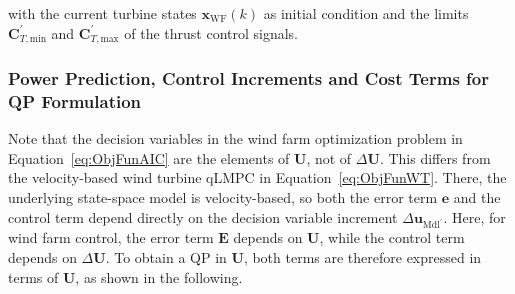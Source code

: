 with the current turbine states $\bm{x}_{\text{WF}}(k)$ as initial condition and the limits $\bm{C}_{T,\text{min}}^\prime$ and $\bm{C}_{T,\text{max}}^\prime$ of the thrust control signals.

\subsubsection{Power Prediction, Control Increments and Cost Terms for QP Formulation}
Note that the decision variables in the wind farm optimization problem in Equation~\eqref{eq:ObjFunAIC} are the elements of $\bm{U}$, not of $\Delta \bm{U}$. This differs from the velocity-based wind turbine qLMPC in Equation~\eqref{eq:ObjFunWT}. There, the underlying state-space model is velocity-based, so both the error term $\bm{e}$ and the control term depend directly on the decision variable increment $\Delta\bm{u}_{\text{Mdl}^\prime}$. Here, for wind farm control, the error term $\bm{E}$ depends on $\bm{U}$, while the control term depends on $\Delta\bm{U}$. To obtain a QP in $\bm{U}$, both terms are therefore expressed in terms of $\bm{U}$, as shown in the following.

